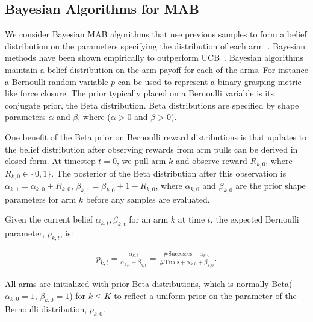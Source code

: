 \documentclass[10pt, conference]{ieeeconf}      %
\begin{document}
\subsection{Bayesian Algorithms for MAB}\label{sec:bandit_algorithm}
We consider Bayesian MAB algorithms that use previous samples to form a belief distribution on the parameters specifying the distribution of each arm~\cite{agrawal2011analysis,weber1992gittins}.  Bayesian methods have been shown empirically to outperform UCB~\cite{chapelle2011empirical, bachman2013greedy}. Bayesian algorithms maintain a belief distribution on the arm payoff for each of the arms. For instance a Bernoulli random variable $p$ can be used to represent a binary grasping metric like force closure. The prior typically placed on a Bernoulli variable is its conjugate prior, the Beta distribution.
Beta distributions are specified by shape parameters $\alpha$ and $\beta$, where ($\alpha >0$ and $\beta >0$).


One benefit of the Beta prior on Bernoulli reward distributions is that updates to the belief distribution after observing rewards from arm pulls can be derived in closed form.
At timestep $t=0$, we pull arm $k$ and observe reward $R_{k,0}$, where $R_{k,0} \in \lbrace 0, 1\rbrace$.
The posterior of the Beta distribution after this observation is $\alpha_{k, 1} = \alpha_{k, 0} + R_{k,0}$,  $\beta_{k, 1} = \beta_{k, 0} + 1-R_{k,0}$, where $\alpha_{k,0}$ and $\beta_{k,0}$ are the prior shape parameters for arm $k$ before any samples are evaluated.

Given the current belief $\alpha_{k, t}, \beta_{k, t}$ for an arm $k$ at time $t$, the expected Bernoulli parameter, $\bar{p}_{k,t}$, is:

\vspace{-2ex}
\begin{align}\label{eq:shape_sampling}
\bar{p}_{k,t} = \frac{\alpha_{k,t}}{\alpha_{k,t} + \beta_{k,t}} = \frac{\mbox{\#Successes} +
\alpha_{k,0}}{\mbox{\#Trials}+\alpha_{k,0}+\beta_{k,0}}.
\end{align}

All arms are initialized with prior Beta distributions, which is normally Beta($\alpha_{k,0}=1$,  $\beta_{k,0} =1$) for $k\leq K$ to reflect a uniform prior on the parameter of the Bernoulli distribution, $p_{k,0}$.

\end{document}
